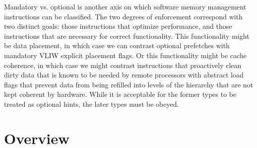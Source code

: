 Mandatory vs. optional is another axis on which software memory management instructions can be classified. The two degrees of enforcement correspond with two distinct goals: those instructions that optimize performance, and those instructions that are necessary for correct functionality.
This functionality might be data placement, in which case we can contrast optional prefetches with mandatory VLIW explicit placement flags. Or this functionality might be cache coherence, in which case we might contrast instructions that proactively clean dirty data that is known to be needed by remote processors with abstract load flags that prevent data from being refilled into levels of the hierarchy that are not kept coherent by hardware. While it is acceptable for the former types to be treated as optional hints, the later types must be obeyed.

\section{Overview}

